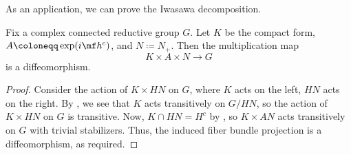 \documentclass[../notes.tex]{subfiles}
\begin{document}
As an application, we can prove the Iwasawa decomposition.
\begin{theorem}
	Fix a complex connected reductive group $G$. Let $K$ be the compact form, $A\coloneqq\exp(i\mf h^c)$, and $N\coloneqq N_+$. Then the multiplication map
	\[K\times A\times N\to G\]
	is a diffeomorphism.
\end{theorem}
\begin{proof}
	Consider the action of $K\times HN$ on $G$, where $K$ acts on the left, $HN$ acts on the right. By , we see that $K$ acts transitively on $G/HN$, so the action of $K\times HN$ on $G$ is transitive. Now, $K\cap HN=H^c$ by , so $K\times AN$ acts transitively on $G$ with trivial stabilizers. Thus, the induced fiber bundle projection is a diffeomorphism, as required.
\end{proof}
\end{document}
